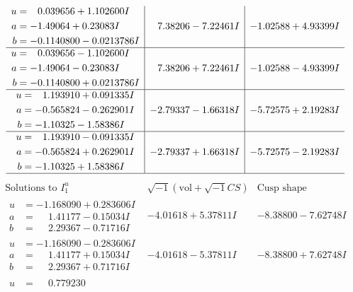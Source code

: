 \documentclass[1p]{elsarticle_modified}
\theoremstyle{definition}
\newcommand{\I}{\sqrt{-1}}
\begin{document}
$$\begin{array}{c|c|c}
\begin{aligned}
u &= \phantom{-}0.039656 + 1.102600 I \\
a &= -1.49064 + 0.23083 I \\
b &= -0.1140800 - 0.0213786 I\end{aligned}
 & \phantom{-}7.38206 - 7.22461 I & -1.02588 + 4.93399 I \\ \hline\begin{aligned}
u &= \phantom{-}0.039656 - 1.102600 I \\
a &= -1.49064 - 0.23083 I \\
b &= -0.1140800 + 0.0213786 I\end{aligned}
 & \phantom{-}7.38206 + 7.22461 I & -1.02588 - 4.93399 I \\ \hline\begin{aligned}
u &= \phantom{-}1.193910 + 0.091335 I \\
a &= -0.565824 - 0.262901 I \\
b &= -1.10325 - 1.58386 I\end{aligned}
 & -2.79337 - 1.66318 I & -5.72575 + 2.19283 I \\ \hline\begin{aligned}
u &= \phantom{-}1.193910 - 0.091335 I \\
a &= -0.565824 + 0.262901 I \\
b &= -1.10325 + 1.58386 I\end{aligned}
 & -2.79337 + 1.66318 I & -5.72575 - 2.19283 I\\
 \hline 
 \end{array}$$\newpage$$\begin{array}{c|c|c}  
\text{Solutions to }I^u_{1}& \I (\text{vol} + \sqrt{-1}CS) & \text{Cusp shape}\\
 \hline 
\begin{aligned}
u &= -1.168090 + 0.283606 I \\
a &= \phantom{-}1.41177 - 0.15034 I \\
b &= \phantom{-}2.29367 - 0.71716 I\end{aligned}
 & -4.01618 + 5.37811 I & -8.38800 - 7.62748 I \\ \hline\begin{aligned}
u &= -1.168090 - 0.283606 I \\
a &= \phantom{-}1.41177 + 0.15034 I \\
b &= \phantom{-}2.29367 + 0.71716 I\end{aligned}
 & -4.01618 - 5.37811 I & -8.38800 + 7.62748 I \\ \hline\begin{aligned}
u &= \phantom{-}0.779230\phantom{ +0.000000I} \\

\end{aligned}
\end{array}$$
\end{document}
